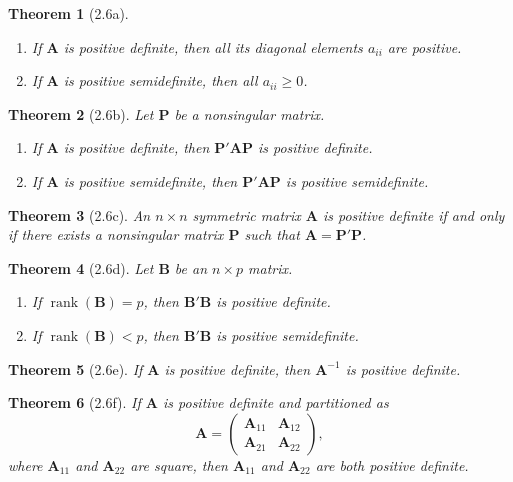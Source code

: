 \documentclass{article}
\newtheorem{theorem}{Theorem}[section]
\begin{document}
\begin{theorem}[2.6a]
\begin{enumerate}[label=(\roman*)]
\item If $\mathbf{A}$ is positive definite, then all its diagonal elements $a_{ii}$ are positive.
\item If $\mathbf{A}$ is positive semidefinite, then all $a_{ii} \geq 0$.
\end{enumerate}
\end{theorem}

\begin{theorem}[2.6b]
Let $\mathbf{P}$ be a nonsingular matrix.
\begin{enumerate}[label=(\roman*)]
\item If $\mathbf{A}$ is positive definite, then $\mathbf{P}'\mathbf{A}\mathbf{P}$ is positive definite.
\item If $\mathbf{A}$ is positive semidefinite, then $\mathbf{P}'\mathbf{A}\mathbf{P}$ is positive semidefinite.
\end{enumerate}
\end{theorem}

\begin{theorem}[2.6c]
An $n \times n$ symmetric matrix $\mathbf{A}$ is positive definite if and only if there exists a nonsingular matrix $\mathbf{P}$ such that $\mathbf{A} = \mathbf{P}'\mathbf{P}$.
\end{theorem}

\begin{theorem}[2.6d]
Let $\mathbf{B}$ be an $n \times p$ matrix.
\begin{enumerate}[label=(\roman*)]
\item If $\operatorname{rank}(\mathbf{B}) = p$, then $\mathbf{B}'\mathbf{B}$ is positive definite.
\item If $\operatorname{rank}(\mathbf{B}) < p$, then $\mathbf{B}'\mathbf{B}$ is positive semidefinite.
\end{enumerate}
\end{theorem}

\begin{theorem}[2.6e]
If $\mathbf{A}$ is positive definite, then $\mathbf{A}^{-1}$ is positive definite.
\end{theorem}

\begin{theorem}[2.6f]
If $\mathbf{A}$ is positive definite and partitioned as
\[
\mathbf{A} = \begin{pmatrix} \mathbf{A}_{11} & \mathbf{A}_{12} \\ \mathbf{A}_{21} & \mathbf{A}_{22} \end{pmatrix},
\]
where $\mathbf{A}_{11}$ and $\mathbf{A}_{22}$ are square, then $\mathbf{A}_{11}$ and $\mathbf{A}_{22}$ are both positive definite.
\end{theorem}
\end{document}
